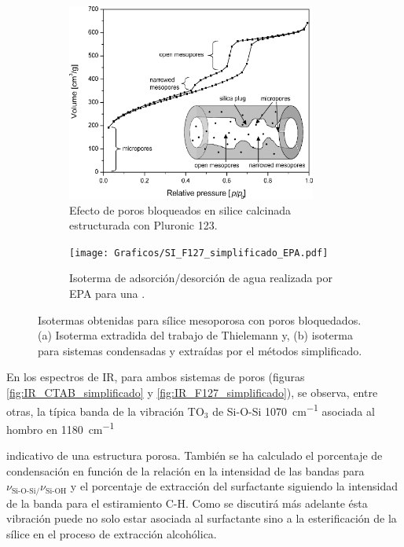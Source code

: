 {			%
			\begin{figure}[th]
		 	   	    \begin{subfigure}[t]{0.49\textwidth}
			       	\includegraphics[width=0.90\textwidth]{Graficos/Doble-distr.png}
			       	\caption{Efecto de poros bloqueados en silice calcinada estructurada con Pluronic 123.}
			       	\label{fig:thielemann}
			   		\end{subfigure}
			   		\begin{subfigure}[t]{0.49\textwidth}
			   	    \texttt{[image: Graficos/SI\_F127\_simplificado\_EPA.pdf]}
			   	    \caption{Isoterma de adsorción/desorción de agua realizada por EPA para una \pdmF.}
			   		\end{subfigure}
					 \caption[Microscopías \pdmF\space tratamiento simplificado.]{Isotermas obtenidas para sílice mesoporosa con poros bloquedados. (a) Isoterma extradida del trabajo de Thielemann\cite{Thielemann2011} y, (b) isoterma para sistemas \pdmF\space condensadas y extraídas por el métodos simplificado.}
					 \label{fig:F127_simplificado_EPA_2}	
				     \end{figure}

			 En los espectros de IR, para ambos sistemas de poros (figuras \ref{fig:IR_CTAB_simplificado} y \ref{fig:IR_F127_simplificado}), se observa, entre otras, la típica banda de la vibración TO$_3$ de Si-O-Si \SI{1070}{\cm^{-1}} asociada al hombro en \SI{1180}{\cm^{-1}}} indicativo de una estructura porosa\cite{Innocenzi2003}. También se ha calculado el porcentaje de condensación en función de la relación en la intensidad de las bandas para $\nu_{\text{Si-O-Si/}}\nu_{\text{Si-OH}}$ y el porcentaje de extracción del surfactante siguiendo la intensidad de la banda para el estiramiento C-H. Como se discutirá más adelante ésta vibración puede no solo estar asociada al surfactante sino a la esterificación de la sílice en el proceso de extracción alcohólica.

